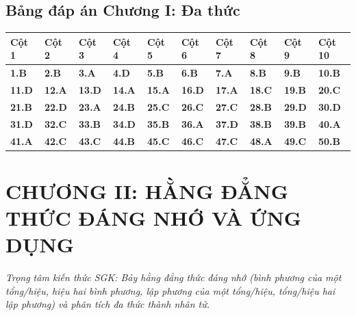 \documentclass[11pt,a4paper]{article}
\begin{document}
\subsection*{\color{primary} Bảng đáp án Chương I: Đa thức}
\begin{center}
\renewcommand{\arraystretch}{1.25}
\begin{tabularx}{\textwidth}{*{10}{>{\centering\arraybackslash}X}}
\toprule
\textbf{\color{primary} Cột 1} & \textbf{\color{primary} Cột 2} & \textbf{\color{primary} Cột 3} & \textbf{\color{primary} Cột 4} & \textbf{\color{primary} Cột 5} & \textbf{\color{primary} Cột 6} & \textbf{\color{primary} Cột 7} & \textbf{\color{primary} Cột 8} & \textbf{\color{primary} Cột 9} & \textbf{\color{primary} Cột 10} \\
\midrule
\textbf{1.B} & \textbf{2.B} & \textbf{3.A} & \textbf{4.D} & \textbf{5.B} & \textbf{6.B} & \textbf{7.A} & \textbf{8.B} & \textbf{9.B} & \textbf{10.B} \\
\rowcolor{rowtint} \textbf{11.D} & \textbf{12.A} & \textbf{13.D} & \textbf{14.A} & \textbf{15.A} & \textbf{16.D} & \textbf{17.A} & \textbf{18.C} & \textbf{19.B} & \textbf{20.C} \\
\textbf{21.B} & \textbf{22.D} & \textbf{23.A} & \textbf{24.B} & \textbf{25.C} & \textbf{26.C} & \textbf{27.C} & \textbf{28.B} & \textbf{29.D} & \textbf{30.D} \\
\rowcolor{rowtint} \textbf{31.D} & \textbf{32.C} & \textbf{33.B} & \textbf{34.D} & \textbf{35.B} & \textbf{36.A} & \textbf{37.D} & \textbf{38.B} & \textbf{39.B} & \textbf{40.A} \\
\textbf{41.A} & \textbf{42.C} & \textbf{43.C} & \textbf{44.B} & \textbf{45.C} & \textbf{46.C} & \textbf{47.C} & \textbf{48.A} & \textbf{49.C} & \textbf{50.B} \\
\bottomrule
\end{tabularx}
\end{center}\vspace{10pt}
\section*{\color{primary} CHƯƠNG II: HẰNG ĐẲNG THỨC ĐÁNG NHỚ VÀ ỨNG DỤNG}
\textit{Trọng tâm kiến thức SGK: Bảy hằng đẳng thức đáng nhớ (bình phương của một tổng/hiệu, hiệu hai bình phương, lập phương của một tổng/hiệu, tổng/hiệu hai lập phương) và phân tích đa thức thành nhân tử.}\par\vspace{4pt}
\end{document}
